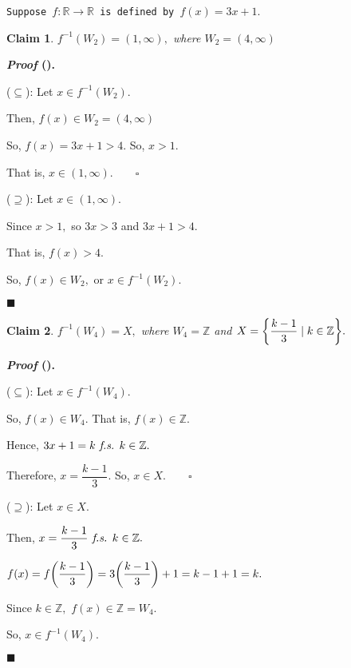 \documentclass[12pt,a4paper]{article}
\newtheorem{clm}{Claim}[subsection]
\newcounter{nprf}[subsection]
\newenvironment*{prf}{\par\indent\textbf{\textit{Proof} (\stepcounter{nprf}\thenprf). }\par }{\par\hfill $\blacksquare$\par}
\def\Z{{\mathbb{Z}}}
\def\R{{\mathbb{R}}}
\def\f{f^{-1}}
\def\fs{\emph{ f.s. }}
\begin{document}
\begin{framed}
\noindent\texttt{Suppose $f:\R\to\R$ is defined by $f(x)=3x+1.$}
\begin{clm}$\f(W_2)=(1,\infty),$ where $W_2=(4,\infty)$\end{clm}
\begin{prf}
	($\subseteq$): Let $x\in f^{-1}(W_2).$\par\hspace{5mm} Then, $f(x)\in W_2=(4,\infty)$\par\hspace{5mm} So, $f(x)=3x+1>4.$ So, $x>1.$\par\hspace{5mm} That is, $x\in(1,\infty).\qquad\square$\par 
	($\supseteq$): Let $x\in(1,\infty).\qquad$\par\hspace{5mm} Since $x>1,$ so $3x>3$ and $3x+1>4.$\par\hspace{5mm} That is, $f(x)>4.$\par\hspace{5mm} So, $f(x)\in W_2,$ or $x\in f^{-1}(W_2).$
\end{prf}
\begin{clm}$f^{-1}(W_4)=X,$ where $W_4=\Z$ and $X=\qty{\dfrac{k-1}{3}\mid k\in\Z}.$\end{clm}
\begin{prf}
	($\subseteq$): Let $x\in f^{-1}(W_4).$\par\hspace{5mm} So, $f(x)\in W_4.$ That is, $f(x)\in\Z.$\par\hspace{5mm} Hence, $3x+1=k\fs k\in\Z.$\par\hspace{5mm} Therefore, $x=\dfrac{k-1}{3}.$ So, $x\in X.\qquad\square$\par 
	($\supseteq$): Let $x\in X.$\par\hspace{5mm} Then, $x=\dfrac{k-1}{3}\fs k\in\Z.\qquad$\par\hspace{5mm} $f(x)=f\qty(\dfrac{k-1}{3})=3\qty(\dfrac{k-1}{3})+1=k-1+1=k.$\par\hspace{5mm} Since $k\in\Z,$ $f(x)\in\Z=W_4.$\par\hspace{5mm} So, $x\in f^{-1}(W_4).$
\end{prf}
\end{framed}
\end{document}
